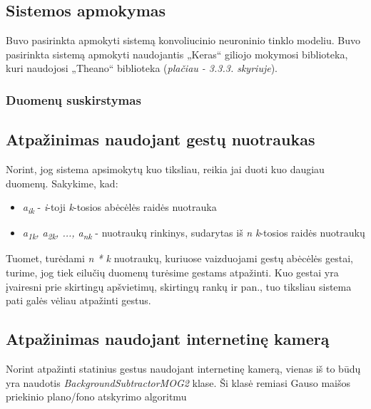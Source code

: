 \documentclass{VUMIFInfKursinis}
\begin{document}
\subsection{Sistemos apmokymas}
Buvo pasirinkta apmokyti sistemą konvoliucinio neuroninio tinklo modeliu. Buvo pasirinkta sistemą apmokyti naudojantis „Keras“ giliojo mokymosi biblioteka, kuri naudojosi „Theano“ biblioteka (\textit{plačiau - 3.3.3. skyriuje}).

\subsubsection{Duomenų suskirstymas}


\subsection{Atpažinimas naudojant gestų nuotraukas}
Norint, jog sistema apsimokytų kuo tiksliau, reikia jai duoti kuo daugiau duomenų. Sakykime, kad:
\begin{itemize}
	\item\textit{a\textsubscript{ik}} - \textit{i}-toji \textit{k}-tosios abėcėlės raidės nuotrauka 
	\item\textit{a\textsubscript{1k}, a\textsubscript{2k}, ..., a\textsubscript{nk}} - nuotraukų rinkinys, sudarytas iš \textit{n} \textit{k}-tosios raidės nuotraukų
\end{itemize}
Tuomet, turėdami \textit{n * k} nuotraukų, kuriuose vaizduojami gestų abėcėlės gestai, turime, jog tiek eilučių duomenų turėsime gestams atpažinti. Kuo gestai yra įvairesni prie skirtingų apšvietimų, skirtingų rankų ir pan., tuo tiksliau sistema pati galės vėliau atpažinti gestus.


\subsection{Atpažinimas naudojant internetinę kamerą}
Norint atpažinti statinius gestus naudojant internetinę kamerą, vienas iš to būdų yra naudotis \textit{BackgroundSubtractorMOG2} klase. Ši klasė remiasi Gauso maišos priekinio plano/fono atskyrimo algoritmu
\end{document}

